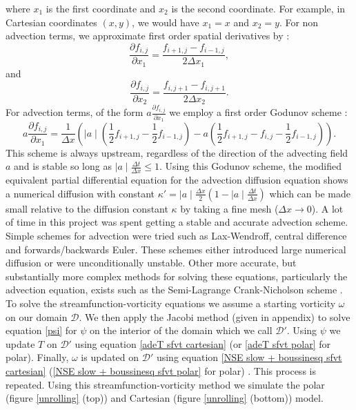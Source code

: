 \documentclass{article}
\begin{document}
where $x_1$ is the first coordinate and $x_2$ is the second coordinate. For example, in Cartesian coordinates $(x,y)$, we would have $x_1=x$ and $x_2=y$. 
For non advection terms, we approximate first order spatial derivatives by \cite{press1986numerical}:
\begin{equation}
	\frac{\partial f_{i,j}}{\partial x_1} = \frac{f_{i+1,j} - f_{i-1,j}}{2{\Delta x_1}},
\end{equation}
and
\begin{equation}
	\frac{\partial f_{i,j}}{\partial x_2} = \frac{f_{i,j+1} - f_{i,j+1}}{2{\Delta x_2}}.
\end{equation}
For advection terms, of the form $a \frac{\partial f_{i,j}}{\partial x_1}$ we employ a first order Godunov scheme \cite{godunov1959difference, guinot2003godunov}:
\begin{equation}
	a \frac{\partial f_{i,j}}{\partial x_1} = \frac{1}{\Delta x} ( \mid a\mid (  \frac{1}{2} f_{i+1,j} - \frac{1}{2} f_{i-1,j}   ) - a ( \frac{1}{2} f_{i+1,j} -f_{i,j} - \frac{1}{2} f_{i-1,j} )).
\end{equation}
This scheme is always upstream, regardless of the direction of the advecting field $a$ and is stable so long as $\mid a \mid \frac{\Delta t}{\Delta x} \leq 1$. Using this Godunov scheme, the modified equivalent partial differential equation for the advection diffusion equation shows a numerical diffusion with constant $\kappa' = \mid a \mid \frac{\Delta x}{2} (1 - \mid a \mid \frac{\Delta t}{\Delta x})$ which can be made small relative to the diffusion constant $\kappa$ by taking a fine mesh ($\Delta x \rightarrow 0$). 
\newline
A lot of time in this project was spent getting a stable and accurate advection scheme. Simple schemes for advection were tried such as Lax-Wendroff, central difference and forwards/backwards Euler. These schemes either introduced large numerical diffusion or were unconditionally unstable. Other more accurate, but substantially more complex methods for solving these equations, particularly the advection equation, exists such as the Semi-Lagrange Crank-Nicholson scheme \cite{spiegelman2006semi}.
\newline
To solve the streamfunction-vorticity equations we assume a starting vorticity $\omega$ on our domain $\mathcal{D}$. We then apply the Jacobi method (given in appendix) to solve equation \ref{psi} for $\psi$ on the interior of the domain which we call $\mathcal{D}'$. 
Using $\psi$ we update $T$ on $\mathcal{D}'$ using equation \ref{adeT sfvt cartesian} (or \ref{adeT sfvt polar} for polar). Finally, $\omega$ is updated on $\mathcal{D}'$ using 
equation \ref{NSE slow + boussinesq sfvt cartesian} (\ref{NSE slow + boussinesq sfvt polar} for polar) \cite{adair2015developing}. This process is repeated.
\newline
Using this streamfunction-vorticity method we simulate the polar (figure \ref{unrolling} (top)) and Cartesian (figure \ref{unrolling} (bottom)) model. 
\end{document}
